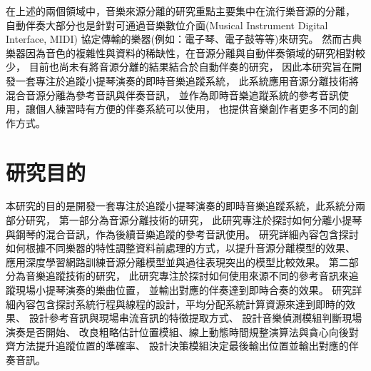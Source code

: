 \documentclass[class=NCU_thesis, crop=false]{standalone}
\begin{document}
在上述的兩個領域中，音樂來源分離的研究重點主要集中在流行樂音源的分離，
自動伴奏大部分也是針對可通過音樂數位介面(Musical Instrument Digital Interface, MIDI)
協定傳輸的樂器(例如：電子琴、電子鼓等等)來研究。
然而古典樂器因為音色的複雜性與資料的稀缺性，在音源分離與自動伴奏領域的研究相對較少，
目前也尚未有將音源分離的結果結合於自動伴奏的研究，
因此本研究旨在開發一套專注於追蹤小提琴演奏的即時音樂追蹤系統，
此系統應用音源分離技術將混合音源分離為參考音訊與伴奏音訊，
並作為即時音樂追蹤系統的參考音訊使用，讓個人練習時有方便的伴奏系統可以使用，
也提供音樂創作者更多不同的創作方式。

\pagebreak

\section{研究目的}

本研究的目的是開發一套專注於追蹤小提琴演奏的即時音樂追蹤系統，此系統分兩部分研究，
第一部分為音源分離技術的研究，
此研究專注於探討如何分離小提琴與鋼琴的混合音訊，作為後續音樂追蹤的參考音訊使用。
研究詳細內容包含探討如何根據不同樂器的特性調整資料前處理的方式，以提升音源分離模型的效果、
應用深度學習網路訓練音源分離模型並與過往表現突出的模型比較效果。
第二部分為音樂追蹤技術的研究，
此研究專注於探討如何使用來源不同的參考音訊來追蹤現場小提琴演奏的樂曲位置，
並輸出對應的伴奏達到即時合奏的效果。
研究詳細內容包含探討系統行程與線程的設計，平均分配系統計算資源來達到即時的效果、
設計參考音訊與現場串流音訊的特徵提取方式、
設計音樂偵測模組判斷現場演奏是否開始、
改良粗略估計位置模組、線上動態時間規整演算法與貪心向後對齊方法提升追蹤位置的準確率、
設計決策模組決定最後輸出位置並輸出對應的伴奏音訊。
\end{document}
